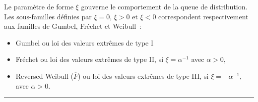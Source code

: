\begin{f}
\end{f}

\begin{f}

Le paramètre de forme \(\xi\) gouverne le comportement de la queue de distribution. 
Les sous-familles définies par \(\xi= 0\), \(\xi>0\) et \(\xi<0\) correspondent respectivement aux familles de Gumbel, Fréchet et Weibull~:
\begin{itemize}
\item 	 Gumbel ou loi des valeurs extrêmes de type I
\item     Fréchet ou loi des valeurs extrêmes de type II, si \(\xi  = \alpha^{-1}\) avec \(\alpha>0\),
\item    Reversed Weibull (\(\overline{F}\)) ou loi des valeurs extrêmes de type III, si \(\xi =-\alpha^{-1} \), avec \(\alpha>0\).
\end{itemize}
\end{f}
\hrule 

